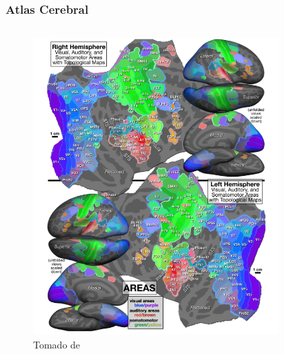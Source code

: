 \documentclass[
11pt, %
%
aspectratio=169, %
]{beamer}
\begin{document}
\begin{frame}
	\frametitle{Atlas Cerebral}
	
		\begin{columns}[t] %
		\begin{column}{0.5\textwidth} %
			
			\begin{figure}			
				\centering
				\includegraphics[scale=0.25]{Graphics/sereno}
				\captionsetup{font=tiny}
				\caption{Tomado de \cite{sereno_topological_2022}}
			\end{figure}		
		\end{column}
		\begin{column}{0.5\textwidth} %
		\begin{figure}			
			\centering

\end{figure}
\end{column}
\end{columns}
\end{frame}
\end{document}
